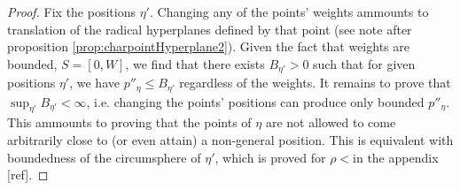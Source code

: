 \begin{remark}
\begin{proof}
Fix the positions $\eta'$.  Changing any of the points' weights ammounts to translation of the radical hyperplanes defined by that point (see note after proposition \ref{prop:charpointHyperplane2}). Given the fact that weights are bounded, $S=[0,W]$, we find that there exists $B_{\eta'}>0$ such that for given positions $\eta'$, we have $p''_\eta \leq B_{\eta'}$ regardless of the weights.
It remains to prove that $\sup_{\eta'} B_{\eta'} < \infty$, i.e. changing the points' positions can produce only bounded $p''_\eta$. This ammounts to proving that the points of $\eta$ are not allowed to come arbitrarily close to (or even attain) a non-general position. This is equivalent with boundedness of the circumsphere of $\eta'$, which is proved for $\rho<$\tbd in the appendix [ref].
\end{proof}



\end{remark}


